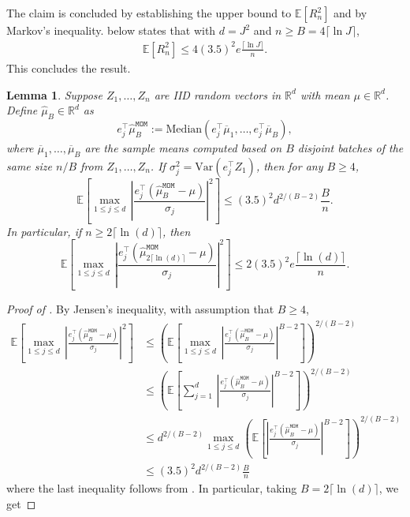 \documentclass[12pt]{article}
\newtheorem{lemma}[theorem]{Lemma}
\begin{document}
\begin{appendices}
The claim is concluded by establishing the upper bound to $\mathbb{E}[R_n^2]$ and by Markov's inequality.  below states that with $d = J^2$ and $n \ge B = 4 \lceil \ln J \rceil$,
\begin{align*}
    \mathbb{E}[R_n^2] \le 4(3.5)^2 e \frac{\lceil \ln J \rceil}{n}.
\end{align*}
This concludes the result.
\begin{lemma}\label{lemma:Rn-bound}
    Suppose $Z_1, \ldots, Z_n$ are IID random vectors in $\mathbb{R}^d$ with mean $\mu\in\mathbb{R}^d$. Define $\widehat{\mu}_B\in\mathbb{R}^d$ as 
    \[
    e_j^{\top}\widehat{\mu}^{\mathtt{MOM}}_B := \mathrm{Median}(e_j^{\top}\overline{\mu}_1, \ldots, e_j^{\top}\overline{\mu}_B),
    \]
    where $\overline{\mu}_1, \ldots, \overline{\mu}_B$ are the sample means computed based on $B$ disjoint batches of the same size $n/B$ from $Z_1, \ldots, Z_n$.
    If $\sigma_j^2 = \mathrm{Var}(e_j^{\top}Z_1)$, then for any $B \ge 4$,
    \[
    \mathbb{E}\left[\max_{1\le j\le d}\,\left|\frac{e_j^{\top}(\widehat{\mu}^{\mathtt{MOM}}_B - \mu)}{\sigma_j}\right|^2\right] \le (3.5)^2 d^{2/(B-2)}\frac{B}{n}.
    \]
    In particular, if $n \ge 2\lceil\ln(d)\rceil$, then  
    \[
    \mathbb{E}\left[\max_{1\le j\le d}\,\left|\frac{e_j^{\top}(\widehat{\mu}^{\mathtt{MOM}}_{2\lceil\ln(d)\rceil} - \mu)}{\sigma_j}\right|^2\right] \le 2(3.5)^2 e\frac{\lceil\ln(d)\rceil}{n}.
    \]
\end{lemma}
\begin{proof}[Proof of ]
    By Jensen's inequality, with assumption that $B\ge 4$, 
    \begin{align*}
     \mathbb{E}\left[\max_{1\le j\le d}\,\left|\frac{e_j^{\top}(\widehat{\mu}^{\mathtt{MOM}}_B - \mu)}{\sigma_j}\right|^2\right] &\le \left(\mathbb{E}\left[\max_{1\le j\le d}\,\left|\frac{e_j^{\top}(\widehat{\mu}^{\mathtt{MOM}}_B - \mu)}{\sigma_j}\right|^{B-2}\right] \right)^{2/(B-2)} \\
     &\le \left(\mathbb{E}\left[\sum_{j=1}^d\,\left|\frac{e_j^{\top}(\widehat{\mu}^{\mathtt{MOM}}_B - \mu)}{\sigma_j}\right|^{B-2}\right] \right)^{2/(B-2)}\\
     &\le d^{2/(B-2)}\max_{1\le j \le d}\left(\mathbb{E}\left[\left|\frac{e_j^{\top}(\widehat{\mu}^{\mathtt{MOM}}_B - \mu)}{\sigma_j}\right|^{B-2}\right] \right)^{2/(B-2)} \\
     &\le (3.5)^2 d^{2/(B-2)}\frac{B}{n}
    \end{align*}
    where the last inequality follows from . In particular, taking $B = 2\lceil\ln(d)\rceil$, we get 

\end{proof}
\end{appendices}
\end{document}

